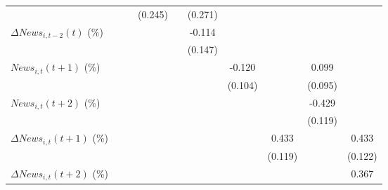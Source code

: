 {\begin{tabular}{l*{9}{c}}
                    &                     &                     &     (0.245)         &                     &     (0.271)         &                     &                     &                     &                     \\
\addlinespace
$ \Delta News_{i,t-2}(t)$ (\%)&                     &                     &                     &                     &      -0.114         &                     &                     &                     &                     \\
                    &                     &                     &                     &                     &     (0.147)         &                     &                     &                     &                     \\
\addlinespace
$ News_{i,t}(t+1)$ (\%)&                     &                     &                     &                     &                     &      -0.120         &                     &       0.099         &                     \\
                    &                     &                     &                     &                     &                     &     (0.104)         &                     &     (0.095)         &                     \\
\addlinespace
$ News_{i,t}(t+2)$ (\%)&                     &                     &                     &                     &                     &                     &                     &      -0.429\sym{***}&                     \\
                    &                     &                     &                     &                     &                     &                     &                     &     (0.119)         &                     \\
\addlinespace
$ \Delta News_{i,t}(t+1)$ (\%)&                     &                     &                     &                     &                     &                     &       0.433\sym{***}&                     &       0.433\sym{***}\\
                    &                     &                     &                     &                     &                     &                     &     (0.119)         &                     &     (0.122)         \\
\addlinespace
$ \Delta News_{i,t}(t+2)$ (\%)&                     &                     &                     &                     &                     &                     &                     &                     &       0.367\sym{**} \\

\end{tabular}}
